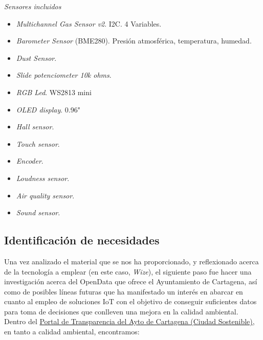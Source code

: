 \documentclass[12pt]{article}
\begin{document}
\noindent \textit{Sensores incluidos}
	
	\begin{itemize}
		\item \textit{Multichannel Gas Sensor v2}. I2C. 4 Variables.
		
		\item \textit{Barometer Sensor} (BME280). Presión atmosférica, temperatura, humedad.
		
		\item \textit{Dust Sensor}. 
		
		\item \textit{Slide potenciometer 10k ohms}.
		
		\item \textit{RGB Led}. WS2813 mini
		
		\item \textit{OLED display}. 0.96"
		
		\item \textit{Hall sensor}. 
		
		\item \textit{Touch sensor}.
		
		\item \textit{Encoder}.
		
		\item \textit{Loudness sensor}.
		
		\item \textit{Air quality sensor}.
		
		\item \textit{Sound sensor}.
	\end{itemize}

	\subsection[Identificación de necesidades]{Identificación de necesidades}
	
	Una vez analizado el material que se nos ha proporcionado, y reflexionado acerca de la tecnología a emplear (en este caso, \textit{Wize}), el siguiente paso fue hacer una investigación acerca del OpenData que ofrece el Ayuntamiento de Cartagena, así como de posibles líneas futuras que ha manifestado un interés en abarcar en cuanto al empleo de soluciones IoT con el objetivo de conseguir suficientes datos para toma de decisiones que conlleven una mejora en la calidad ambiental. \\
	
	\noindent	Dentro del 		\href{https://www.cartagena.es/plantillas/14b.asp?pt_idpag=1431}{Portal de Transparencia del Ayto de Cartagena (Ciudad Sostenible)}, en tanto a calidad ambiental, encontramos:
	
\end{document}

